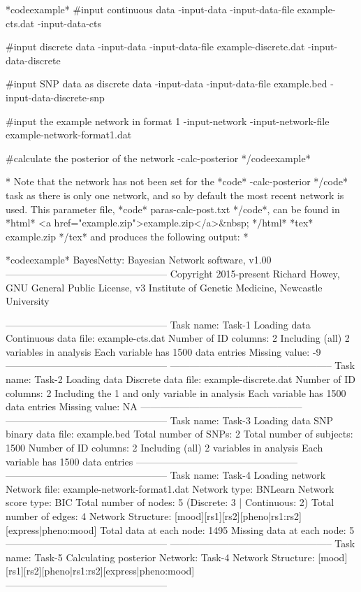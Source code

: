 *codeexample* #input continuous data -input-data -input-data-file example-cts.dat -input-data-cts

#input discrete data -input-data -input-data-file example-discrete.dat -input-data-discrete

#input SNP data as discrete data -input-data -input-data-file example.bed -input-data-discrete-snp

#input the example network in format 1 -input-network -input-network-file example-network-format1.dat

#calculate the posterior of the network -calc-posterior */codeexample*


* Note that the network has not been set for the *code* -calc-posterior */code* task as there is only one network, and so by default the most recent network is used. This parameter file, *code* paras-calc-post.txt */code*, can be found in *html* <a href="example.zip">example.zip</a>&nbsp; */html* *tex* example.zip */tex* and produces the following output: *

*codeexample* BayesNetty: Bayesian Network software, v1.00 -------------------------------------------------- Copyright 2015-present Richard Howey, GNU General Public License, v3 Institute of Genetic Medicine, Newcastle University

-------------------------------------------------- Task name: Task-1 Loading data Continuous data file: example-cts.dat Number of ID columns: 2 Including (all) 2 variables in analysis Each variable has 1500 data entries Missing value: -9 -------------------------------------------------- -------------------------------------------------- Task name: Task-2 Loading data Discrete data file: example-discrete.dat Number of ID columns: 2 Including the 1 and only variable in analysis Each variable has 1500 data entries Missing value: NA -------------------------------------------------- -------------------------------------------------- Task name: Task-3 Loading data SNP binary data file: example.bed Total number of SNPs: 2 Total number of subjects: 1500 Number of ID columns: 2 Including (all) 2 variables in analysis Each variable has 1500 data entries -------------------------------------------------- -------------------------------------------------- Task name: Task-4 Loading network Network file: example-network-format1.dat Network type: BNLearn Network score type: BIC Total number of nodes: 5 (Discrete: 3 | Continuous: 2) Total number of edges: 4 Network Structure: [mood][rs1][rs2][pheno|rs1:rs2][express|pheno:mood] Total data at each node: 1495 Missing data at each node: 5 -------------------------------------------------- -------------------------------------------------- Task name: Task-5 Calculating posterior Network: Task-4 Network Structure: [mood][rs1][rs2][pheno|rs1:rs2][express|pheno:mood] --------------------------------------------------

